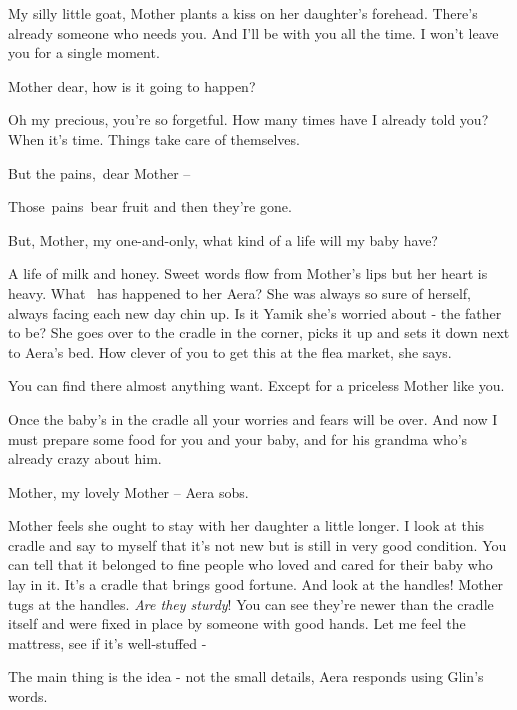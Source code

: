 \documentclass[12pt]{book}
\begin{document}
{\textquotedbl}My silly little goat,{\textquotedbl} Mother plants a kiss on her daughter's forehead.
{\textquotedbl}There's already someone who needs you. And I'll be with you all the time. I won't leave you for a single
moment.{\textquotedbl}

{\textquotedbl}Mother dear, how is it going to happen?{\textquotedbl}

{\textquotedbl}Oh my precious, you're so forgetful. How many times have I already told you? When it's time. Things take
care of themselves.{\textquotedbl}

{\textquotedbl}But the pains,~dear Mother -- {\textquotedbl}

{\textquotedbl}Those~pains~bear fruit and then they're gone.{\textquotedbl}

{\textquotedbl}But, Mother, my one-and-only, what kind of a life will my baby have?{\textquotedbl}

{\textquotedbl}A life of milk and honey.{\textquotedbl} Sweet words flow from Mother's lips but her heart is heavy. What
\ has happened to her Aera? She was always so sure of herself, always facing each new day chin up. Is it Yamik she's
worried about - the father to be? She goes over to the cradle in the corner, picks it up and sets it down next to
Aera's bed. {\textquotedbl}How clever of you to get this at the flea market,{\textquotedbl} she says.

{\textquotedbl}You can find there almost anything want. Except for a priceless Mother like you.{\textquotedbl}

{\textquotedbl}Once the baby's in the cradle all your worries and fears will be over. And now I must prepare some food
for you and your baby, and for his grandma who's already crazy about him.{\textquotedbl}

{\textquotedbl}Mother, my lovely Mother --{\textquotedbl} Aera sobs. ~

Mother feels she ought to stay with her daughter a little longer. {\textquotedbl}I look at this cradle and say to myself
that it's not new but is{ }still in very good condition. You can tell that it belonged to fine people
who loved and cared for their baby who lay in it. It's a cradle that brings good fortune. And look at the
handles!{\textquotedbl} Mother tugs at the handles. {\textquotedbl}\textit{Are they sturdy}! You can see they're newer
than the cradle itself and were fixed in place by someone with good hands. Let me feel the mattress, see if it's
well-stuffed -{\textquotedbl}

{\textquotedbl}The main thing is the idea - not the small details,{\textquotedbl} Aera responds using Glin's words.
\end{document}
